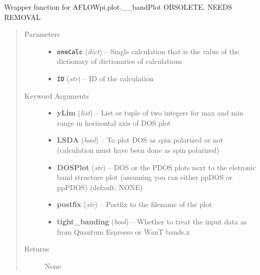 \documentclass[letterpaper,10pt,english]{sphinxmanual}
\begin{document}

\begin{fulllineitems}
\label{plot:plot.__bands}
Wrapper function for AFLOWpi.plot.\_\_bandPlot
OBSOLETE. NEEDS REMOVAL
\begin{quote}\begin{description}
\item[{Parameters}] \leavevmode\begin{itemize}
\item {} 
\textbf{\texttt{oneCalc}} (\emph{dict}) -- Single calculation that is the value of the dictionary of dictionaries of calculations

\item {} 
\textbf{\texttt{ID}} (\emph{str}) -- ID of the calculation

\end{itemize}

\item[{Keyword Arguments}] \leavevmode\begin{itemize}
\item {} 
\textbf{yLim} (\emph{list}) --
List or tuple of two integers for max and min range in horizontal axis of DOS plot

\item {} 
\textbf{LSDA} (\emph{bool}) --
To plot DOS as spin polarized or not (calculation must have been done as spin polarized)

\item {} 
\textbf{DOSPlot} (\emph{str}) --
DOS or the PDOS plots next to the eletronic band structure plot (assuming you ran
either ppDOS or ppPDOS) (default: NONE)

\item {} 
\textbf{postfix} (\emph{str}) --
Postfix to the filename of the plot

\item {} 
\textbf{tight\_banding} (\emph{bool}) --
Whether to treat the input data as from Quantum Espresso or WanT bands.x

\end{itemize}

\item[{Returns}] \leavevmode
None

\end{description}\end{quote}

\end{fulllineitems}
\end{document}
